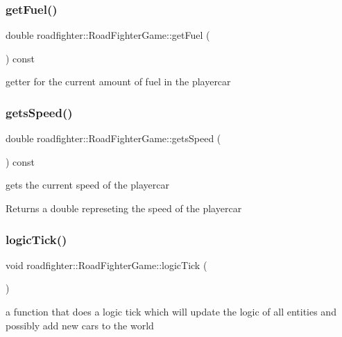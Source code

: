\subsubsection{\texorpdfstring{get\+Fuel()}{getFuel()}}
{\footnotesize\ttfamily double roadfighter\+::\+Road\+Fighter\+Game\+::get\+Fuel (\begin{DoxyParamCaption}{ }\end{DoxyParamCaption}) const}

getter for the current amount of fuel in the playercar \mbox{\label{classroadfighter_1_1RoadFighterGame_afd3d3d025119a6f730667b4924a3a42a}} 
\subsubsection{\texorpdfstring{gets\+Speed()}{getsSpeed()}}
{\footnotesize\ttfamily double roadfighter\+::\+Road\+Fighter\+Game\+::gets\+Speed (\begin{DoxyParamCaption}{ }\end{DoxyParamCaption}) const}

gets the current speed of the playercar \begin{DoxyReturn}{Returns}
a double represeting the speed of the playercar 
\end{DoxyReturn}
\mbox{\label{classroadfighter_1_1RoadFighterGame_a93f5ff51df58787f464e2e5109e8b362}} 
\subsubsection{\texorpdfstring{logic\+Tick()}{logicTick()}}
{\footnotesize\ttfamily void roadfighter\+::\+Road\+Fighter\+Game\+::logic\+Tick (\begin{DoxyParamCaption}{ }\end{DoxyParamCaption})}

a function that does a logic tick which will update the logic of all entities and possibly add new cars to the world \mbox{\label{classroadfighter_1_1RoadFighterGame_abfcb2aefc8031e61e7911dec0a1e0d5f}} 
